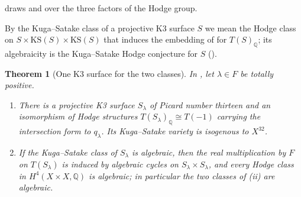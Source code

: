 \documentclass[11pt,reqno]{amsart}
\theoremstyle{plain}
\newtheorem{theorem}{Theorem}[section]
\theoremstyle{definition}
\theoremstyle{remark}
\newcommand{\QQ}{\mathbb{Q}}
\begin{document}
 draws  and  over
the three factors of the Hodge group.

By the Kuga--Satake class of a projective K3 surface $S$ we mean the Hodge
class on $S\times\mathrm{KS}(S)\times\mathrm{KS}(S)$ that induces the embedding
of \cite[Proposition~11.7]{paperI} for $T(S)_{\QQ}$; its algebraicity is the Kuga--Satake
Hodge conjecture for $S$ (\cite[Remark~11.8]{paperI}).

\begin{theorem}[One K3 surface for the two classes]\label{thm:mumfordks}
In , let $\lambda\in F$ be totally positive.
\begin{enumerate}[label=\textup{(\roman*)},nosep,leftmargin=2.6em]
\item There is a projective K3 surface $S_{\lambda}$ of Picard number
  thirteen and an isomorphism of Hodge structures
  $T(S_{\lambda})_{\QQ}\cong T(-1)$ carrying the intersection form to
  $q_{\lambda}$. Its Kuga--Satake variety is isogenous to $X^{32}$.
\item If the Kuga--Satake class of $S_{\lambda}$ is algebraic, then the real
  multiplication by $F$ on $T(S_{\lambda})$ is induced by algebraic cycles on
  $S_{\lambda}\times S_{\lambda}$, and every Hodge class in
  $H^{4}(X\times X,\QQ)$ is algebraic; in particular the two classes of
  (ii) are algebraic.
\end{enumerate}
\end{theorem}
\end{document}
